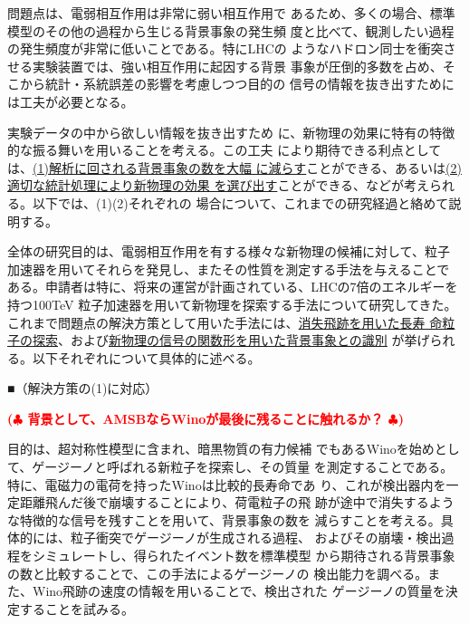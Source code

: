 \documentclass[11pt,a4paper,twoside,dvipdfmx]{jarticle}		%
\def\rem#1{ {\bf\textcolor{red}{($\clubsuit$ #1 $\clubsuit$)}}}
\newcommand{\研究課題名}{粒子加速器を用いた電弱相互作用を持つ新物理の探索}
\newcommand{\研究機関名}{東京大学}
\newcommand{\申請者氏名}{千草颯}
\newcommand{\研究代表者氏名}{\申請者氏名}
\newcommand{\研究期間の最終元号年度}{34}	%
\begin{document}
{\pmb{\textbf{【問題点]}} 問題点は、電弱相互作用は非常に弱い相互作用で
あるため、多くの場合、標準模型のその他の過程から生じる背景事象の発生頻
度と比べて、観測したい過程の発生頻度が非常に低いことである。特にLHCの
ようなハドロン同士を衝突させる実験装置では、強い相互作用に起因する背景
事象が圧倒的多数を占め、そこから統計・系統誤差の影響を考慮しつつ目的の
信号の情報を抜き出すためには工夫が必要となる。

\vspace*{1mm}

 実験データの中から欲しい情報を抜き出すため
に、新物理の効果に特有の特徴的な振る舞いを用いることを考える。この工夫
により期待できる利点としては、\ul{(1)解析に回される背景事象の数を大幅
に減らす}ことができる、あるいは\ul{(2)適切な統計処理により新物理の効果
を選び出す}ことができる、などが考えられる。以下では、(1)(2)それぞれの
場合について、これまでの研究経過と絡めて説明する。

\vspace*{1mm}


\vspace*{1mm}

全体の研究目的は、電弱相互作用を有する様々な新物理の候補に対して、粒子
加速器を用いてそれらを発見し、またその性質を測定する手法を与えることで
ある。申請者は特に、将来の運営が計画されている、LHCの7倍のエネルギーを
持つ100TeV 粒子加速器を用いて新物理を探索する手法について研究してきた。
これまで問題点の解決方策として用いた手法には、\ul{消失飛跡を用いた長寿
命粒子の探索}、および\ul{新物理の信号の関数形を用いた背景事象との識別}
が挙げられる。以下それぞれについて具体的に述べる。

\vspace*{1mm}

■（解決方策の(1)に対応）

\rem{背景として、AMSBならWinoが最後に残ることに触れるか？}

 目的は、超対称性模型に含まれ、暗黒物質の有力候補
でもあるWinoを始めとして、ゲージーノと呼ばれる新粒子を探索し、その質量
を測定することである。特に、電磁力の電荷を持ったWinoは比較的長寿命であ
り、これが検出器内を一定距離飛んだ後で崩壊することにより、荷電粒子の飛
跡が途中で消失するような特徴的な信号を残すことを用いて、背景事象の数を
減らすことを考える。具体的には、粒子衝突でゲージーノが生成される過程、
およびその崩壊・検出過程をシミュレートし、得られたイベント数を標準模型
から期待される背景事象の数と比較することで、この手法によるゲージーノの
検出能力を調べる。また、Wino飛跡の速度の情報を用いることで、検出された
ゲージーノの質量を決定することを試みる。

}
\end{document}
